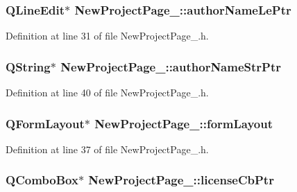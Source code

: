 \hypertarget{class_new_project_page__3_aea99558cfb4c4d06ab1d090276c8b500}{
\subsubsection[{author\-Name\-Le\-Ptr}]{\setlength{\rightskip}{0pt plus 5cm}Q\-Line\-Edit$\ast$ New\-Project\-Page\-\_\-::author\-Name\-Le\-Ptr\hspace{0.3cm}{\ttfamily [private]}}}\label{class_new_project_page__3_aea99558cfb4c4d06ab1d090276c8b500}


Definition at line 31 of file New\-Project\-Page\-\_.\-h.

\hypertarget{class_new_project_page__3_a40c6cfc7ba480fd2572459c9ff2d08bb}{
\subsubsection[{author\-Name\-Str\-Ptr}]{\setlength{\rightskip}{0pt plus 5cm}Q\-String$\ast$ New\-Project\-Page\-\_\-::author\-Name\-Str\-Ptr\hspace{0.3cm}{\ttfamily [private]}}}\label{class_new_project_page__3_a40c6cfc7ba480fd2572459c9ff2d08bb}


Definition at line 40 of file New\-Project\-Page\-\_.\-h.

\hypertarget{class_new_project_page__3_aae75a18bd217f0736861efe3e3821a6d}{
\subsubsection[{form\-Layout}]{\setlength{\rightskip}{0pt plus 5cm}Q\-Form\-Layout$\ast$ New\-Project\-Page\-\_\-::form\-Layout\hspace{0.3cm}{\ttfamily [private]}}}\label{class_new_project_page__3_aae75a18bd217f0736861efe3e3821a6d}


Definition at line 37 of file New\-Project\-Page\-\_.\-h.

\hypertarget{class_new_project_page__3_a6459aad502f0b64eb7e16b38261bae85}{
\subsubsection[{license\-Cb\-Ptr}]{\setlength{\rightskip}{0pt plus 5cm}Q\-Combo\-Box$\ast$ New\-Project\-Page\-\_\-::license\-Cb\-Ptr\hspace{0.3cm}{\ttfamily [private]}}}\label{class_new_project_page__3_a6459aad502f0b64eb7e16b38261bae85}


